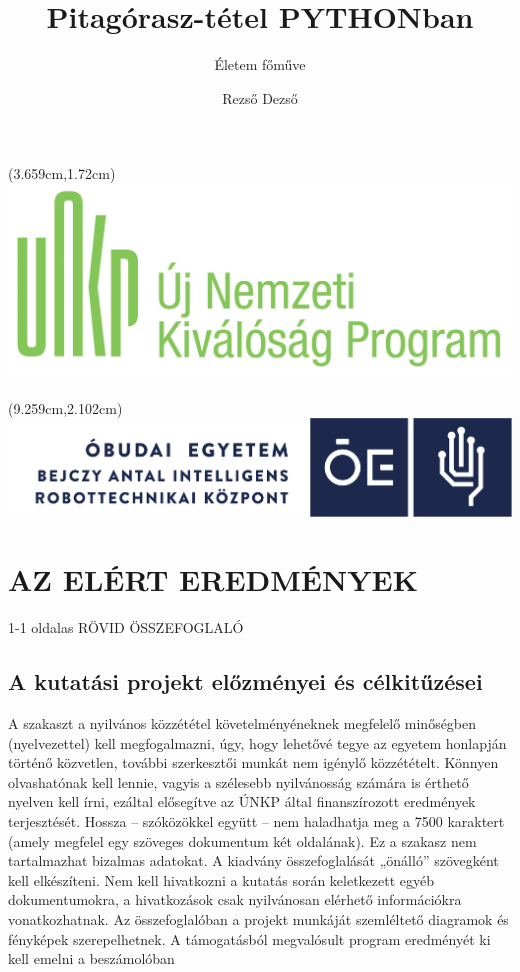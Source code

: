 \documentclass[graybox,envcountchap,sectrefs]{svmono}
\author{Rezső Dezső}
\title{\Huge Pitagórasz-tétel PYTHONban}
\subtitle{Életem főműve} %
\begin{document}
\begin{textblock*}{0.65\textwidth}(3.659cm,1.72cm)
	\includegraphics[width=0.7\linewidth]{img/unkp_logo-04}
\end{textblock*}
\begin{textblock*}{0.74\textwidth}(9.259cm,2.102cm)
	\includegraphics[width=\textwidth]{img/OEBARKHUNLEFT.pdf}
\end{textblock*}

\maketitle


\section{AZ ELÉRT EREDMÉNYEK}

1-1 oldalas RÖVID ÖSSZEFOGLALÓ 

\subsection{A kutatási projekt előzményei és célkitűzései}

A szakaszt a nyilvános közzététel követelményéneknek megfelelő minőségben (nyelvezettel) kell megfogalmazni, úgy, hogy lehetővé tegye az egyetem honlapján történő közvetlen, további szerkesztői munkát nem igénylő közzétételt. Könnyen olvashatónak kell lennie, vagyis a szélesebb nyilvánosság számára is érthető nyelven kell írni, ezáltal elősegítve az ÚNKP által finanszírozott eredmények terjesztését. Hossza – szóközökkel együtt – nem haladhatja meg a 7500 karaktert (amely megfelel egy szöveges dokumentum két oldalának). Ez a szakasz nem tartalmazhat bizalmas adatokat.
A kiadvány összefoglalását „önálló” szövegként kell elkészíteni. Nem kell hivatkozni a kutatás során keletkezett egyéb dokumentumokra, a hivatkozások csak nyilvánosan elérhető információkra vonatkozhatnak.
Az összefoglalóban a projekt munkáját szemléltető diagramok és fényképek szerepelhetnek.
A támogatásból megvalósult program eredményét ki kell emelni a beszámolóban
\end{document}
